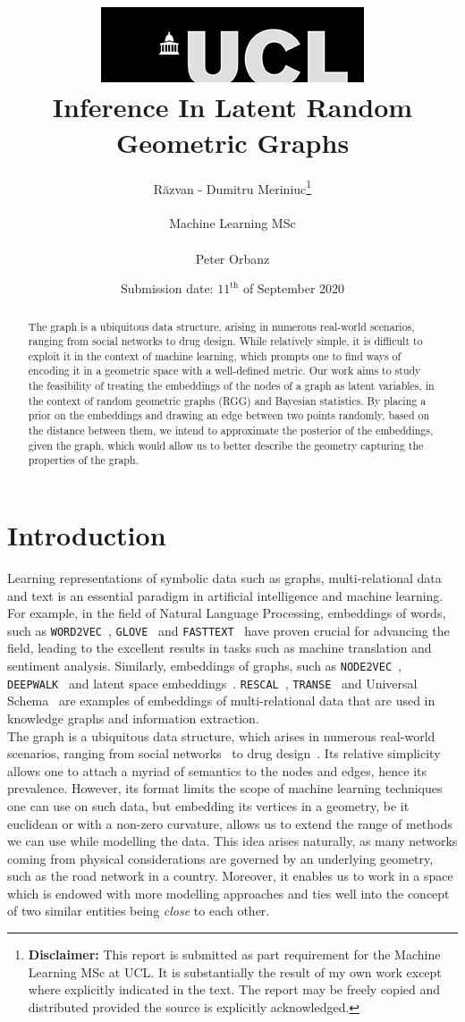 \documentclass[12pt]{report}
\title{  	{ \includegraphics[scale=.5]{ucl_logo.png}}\\
{{\Huge Inference In Latent Random Geometric Graphs}}\\
		}
\date{Submission date: $11^\text{th}$ of September 2020}
\author{R\u{a}zvan - Dumitru Meriniuc\thanks{
{\bf Disclaimer:}
This report is submitted as part requirement for the Machine Learning MSc at UCL. It is
substantially the result of my own work except where explicitly indicated in the text.
The report may be freely copied and distributed provided the source is explicitly acknowledged.}
\\ \\
Machine Learning MSc\\ \\
Peter Orbanz}
\begin{document}
 
\maketitle
\begin{abstract}
    The graph is a ubiquitous data structure, arising in numerous real-world scenarios, ranging from social networks to drug design. While relatively simple, it is difficult to exploit it in the context of machine learning, which prompts one to find ways of encoding it in a geometric space with a well-defined metric. Our work aims to study the feasibility of treating the embeddings of the nodes of a graph as latent variables, in the context of random geometric graphs (RGG) and Bayesian statistics. By placing a prior on the embeddings and drawing an edge between two points randomly, based on the distance between them, we intend to approximate the posterior of the embeddings, given the graph, which would allow us to better describe the geometry capturing the properties of the graph.

\end{abstract}
\tableofcontents
\setcounter{page}{1}


\chapter{Introduction}
Learning representations of symbolic data such as graphs, multi-relational data and text is an essential paradigm in artificial intelligence and machine learning. For example, in the field of Natural Language Processing, embeddings of words, such as \texttt{WORD2VEC}~\parencite{word2vec}, \texttt{GLOVE}~\parencite{glove} and \texttt{FASTTEXT}~\parencite{fasttext} have proven crucial for advancing the field, leading to the excellent results in tasks such as machine translation and sentiment analysis. Similarly, embeddings of graphs, such as \texttt{NODE2VEC}~\parencite{node2vec}, \texttt{DEEPWALK}~\parencite{deepwalk} and latent space embeddings~\parencite{hoff2002latent}. \texttt{RESCAL}~\parencite{rescal}, \texttt{TRANSE}~\parencite{transe} and Universal Schema~\parencite{universalschema} are examples of embeddings of multi-relational data that are used in knowledge graphs and information extraction. \\

The graph is a ubiquitous data structure, which arises in numerous real-world scenarios, ranging from social networks~\parencite{socialnetwork} to drug design~\parencite{graphprotein}. Its relative simplicity allows one to attach a myriad of semantics to the nodes and edges, hence its prevalence. However, its format limits the scope of machine learning techniques one can use on such data, but embedding its vertices in a geometry, be it euclidean or with a non-zero curvature, allows us to extend the range of methods we can use while modelling the data. This idea arises naturally, as many networks coming from physical considerations are governed by an underlying geometry, such as the road network in a country. Moreover, it enables us to work in a space which is endowed with more modelling approaches and ties well into the concept of two similar entities being \textit{close} to each other. \\
\end{document}
